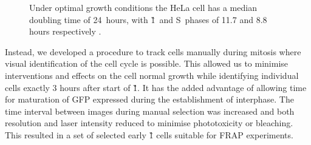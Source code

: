       \begin{figure}
        \centering
        \newcommand{\slice}[4]{
          \pgfmathparse{0.5*#1+0.5*#2}
          \let\midangle\pgfmathresult

          \draw[thick,fill=black!10] (0,0) -- (#1:1) arc (#1:#2:1) -- cycle;

          \node[label=\midangle:#4] at (\midangle:1) {};

          \pgfmathparse{min((#2-#1-10)/110*(-0.3),0)}
          \let\temp\pgfmathresult
          \pgfmathparse{max(\temp,-0.5) + 0.8}
          \let\innerpos\pgfmathresult
          \node at (\midangle:\innerpos) {#3};
        }
          {
            Under optimal growth conditions the HeLa cell has a median
            doubling time of 24~hours, with \G1~and
            S~phases of 11.7 and 8.8 hours respectively \citep{HeLaCellCycle}.
          }
        \label{fig:kill-frap:cell-cycle}
      \end{figure}

    Instead, we developed a procedure to track cells manually during mitosis
    where visual identification of the cell cycle is possible.
    This allowed us to minimise interventions
    and effects on the cell normal growth
    while identifying individual cells exactly 3 hours after start of \G1{}.
    It has the added advantage of allowing time for maturation of GFP
    expressed during the establishment of interphase.
    The time interval between images during manual selection was increased and
    both resolution and laser intensity reduced
    to minimise phototoxicity or bleaching.
    This resulted in a set of selected early \G1{}
    cells suitable for FRAP experiments.

